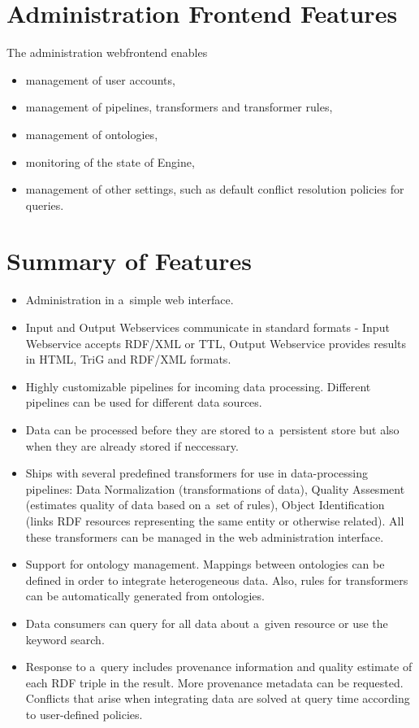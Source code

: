 \section{Administration Frontend Features}
The administration webfrontend enables
\begin{itemize}
  \item management of user accounts,
  \item management of pipelines, transformers and transformer rules,
  \item management of ontologies,
  \item monitoring of the state of Engine,
  \item management of other settings, such as default conflict resolution policies for queries.  
\end{itemize}

\section{Summary of Features}

\begin{itemize}
  \item Administration in a~simple web interface.
  \item Input and Output Webservices communicate in standard formats - Input Webservice accepts RDF/XML or TTL, Output Webservice provides results in HTML, TriG and RDF/XML formats.
  \item Highly customizable pipelines for incoming data processing. Different pipelines can be used for different data sources.
  \item Data can be processed before they are stored to a~persistent store but also when they are already stored if neccessary.
  \item Ships with several predefined transformers for use in data-processing pipelines: Data Normalization (transformations of data), Quality Assesment (estimates quality of data based on a~set of rules), Object Identification (links RDF resources representing the same entity or otherwise related). All these transformers can be managed in the web administration interface.
  \item Support for ontology management. Mappings between ontologies can be defined in order to integrate heterogeneous data. Also, rules for  transformers can be automatically generated from ontologies.
  \item Data consumers can query for all data about a~given resource or use the keyword search.
  \item Response to a~query includes provenance information and quality estimate of each RDF triple in the result. More provenance metadata can be requested. Conflicts that arise when integrating data are solved at query time according to user-defined policies. 
\end{itemize}


